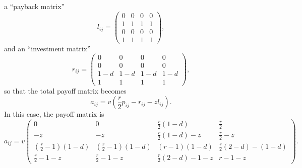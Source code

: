 \documentclass[13pt]{amsart}
\begin{document}
a ``payback matrix''
\begin{equation}
    l_{ij} =
    \begin{pmatrix}
        0 & 0 & 0 & 0 \\
        1 & 1 & 1 & 1 \\
        0 & 0 & 0 & 0 \\
        1 & 1 & 1 & 1
    \end{pmatrix},
\end{equation}
and an ``investment matrix''
\begin{equation}
    r_{ij} =
    \begin{pmatrix}
        0 & 0 & 0 & 0 \\
        0 & 0 & 0 & 0 \\
        1-d & 1-d & 1-d & 1-d \\
        1 & 1 & 1 & 1
    \end{pmatrix},
\end{equation}
so that the total payoff matrix becomes
\begin{equation}
    a_{ij} = v(\frac{r}{2} p_{ij} - r_{ij} - zl_{ij}).
    \label{eq:long_version}
\end{equation}
In this case, the payoff matrix is
\begin{equation}
    a_{ij} = v
    \begin{pmatrix}
        0 & 0 & \frac{r}{2}(1-d) & \frac{r}{2} \\
        -z & -z & \frac{r}{2}(1-d) -z & \frac{r}{2} -z \\
        (\frac{r}{2} - 1)(1-d) & (\frac{r}{2} - 1)(1-d) & (r-1)(1-d)& \frac{r}{2}(2 - d) - (1-d)\\
        \frac{r}{2} - 1 - z & \frac{r}{2} - 1 -z & \frac{r}{2}(2 - d) - 1 - z & r - 1 -z
    \end{pmatrix}.
\end{equation}
\end{document}
